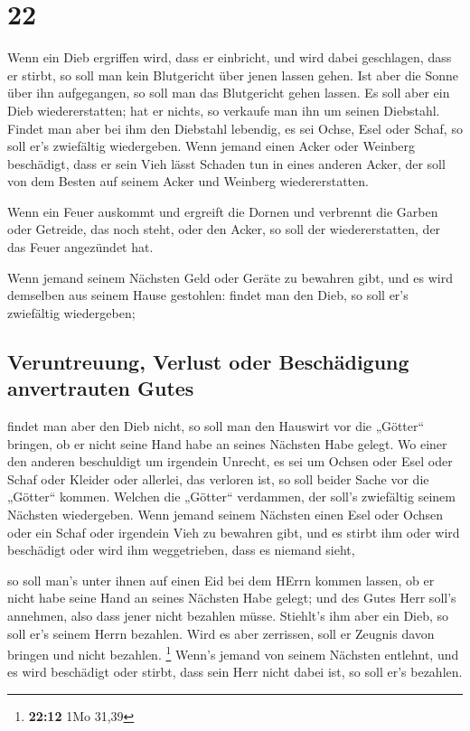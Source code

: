 \hypertarget{section-21}{%
\section{22}\label{section-21}}

 Wenn ein Dieb ergriffen wird, dass er einbricht, und wird
dabei geschlagen, dass er stirbt, so soll man kein Blutgericht über
jenen lassen gehen.  Ist aber die Sonne über ihn
aufgegangen, so soll man das Blutgericht gehen lassen. Es soll aber ein
Dieb wiedererstatten; hat er nichts, so verkaufe man ihn um seinen
Diebstahl.  Findet man aber bei ihm den Diebstahl
lebendig, es sei Ochse, Esel oder Schaf, so soll er's zwiefältig
wiedergeben.  Wenn jemand einen Acker oder Weinberg
beschädigt, dass er sein Vieh lässt Schaden tun in eines anderen Acker,
der soll von dem Besten auf seinem Acker und Weinberg wiedererstatten.

 Wenn ein Feuer auskommt und ergreift die Dornen und
verbrennt die Garben oder Getreide, das noch steht, oder den Acker, so
soll der wiedererstatten, der das Feuer angezündet hat.

 Wenn jemand seinem Nächsten Geld oder Geräte zu bewahren
gibt, und es wird demselben aus seinem Hause gestohlen: findet man den
Dieb, so soll er's zwiefältig wiedergeben;

\hypertarget{veruntreuung-verlust-oder-beschuxe4digung-anvertrauten-gutes}{%
\subsection{Veruntreuung, Verlust oder Beschädigung anvertrauten
Gutes}\label{veruntreuung-verlust-oder-beschuxe4digung-anvertrauten-gutes}}

 findet man aber den Dieb nicht, so soll man den Hauswirt
vor die „Götter`` bringen, ob er nicht seine Hand habe an seines
Nächsten Habe gelegt.  Wo einer den anderen beschuldigt um
irgendein Unrecht, es sei um Ochsen oder Esel oder Schaf oder Kleider
oder allerlei, das verloren ist, so soll beider Sache vor die „Götter``
kommen. Welchen die „Götter`` verdammen, der soll's zwiefältig seinem
Nächsten wiedergeben.  Wenn jemand seinem Nächsten einen
Esel oder Ochsen oder ein Schaf oder irgendein Vieh zu bewahren gibt,
und es stirbt ihm oder wird beschädigt oder wird ihm weggetrieben, dass
es niemand sieht,

 so soll man's unter ihnen auf einen Eid bei dem HErrn
kommen lassen, ob er nicht habe seine Hand an seines Nächsten Habe
gelegt; und des Gutes Herr soll's annehmen, also dass jener nicht
bezahlen müsse.  Stiehlt's ihm aber ein Dieb, so soll
er's seinem Herrn bezahlen.  Wird es aber zerrissen, soll
er Zeugnis davon bringen und nicht bezahlen. \footnote{\textbf{22:12}
  1Mo 31,39}  Wenn's jemand von seinem Nächsten entlehnt,
und es wird beschädigt oder stirbt, dass sein Herr nicht dabei ist, so
soll er's bezahlen.


